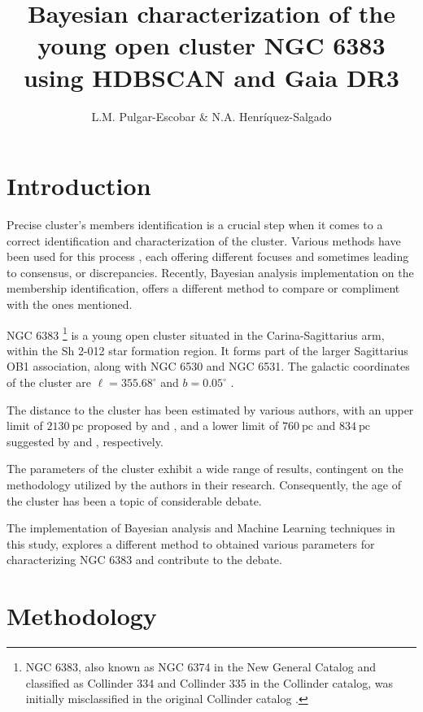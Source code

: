 \documentclass[baaa]{baaa}
\title{Bayesian characterization of the young open cluster NGC 6383 using HDBSCAN and Gaia DR3}
\author{
L.M. Pulgar-Escobar \inst{1} \& N.A. Henríquez-Salgado\inst{1}}
\institute{Departamento de Astronom{\'\i}a, Universidad de Concepci\'on, Chile
}
\begin{document}
\maketitle

\section{Introduction}\label{S_intro}

Precise cluster’s members identification is a crucial step when it comes to a correct identification and characterization of the cluster. Various methods have been used for this process  \citep{ 1968ArA.....5....1L,1978MNRAS.182..607F, 1989MNRAS.236..263P, 2005AA...438.1163K, 2007AA...462..157P}, each offering different focuses and sometimes leading to consensus, or discrepancies. Recently, Bayesian analysis implementation on the membership identification, offers a different method to compare or compliment with the ones mentioned.

NGC 6383 \footnote{NGC 6383, also known as NGC 6374 in the New General Catalog and classified as Collinder 334 and Collinder 335 in the Collinder catalog, was initially misclassified in the original Collinder catalog \citep{1931AnLun...2....1C}.} is a young open cluster situated in the Carina-Sagittarius arm, within the Sh 2-012 star formation region. It forms part of the larger Sagittarius OB1 association, along with NGC 6530 and NGC 6531. The galactic coordinates of the cluster are $\ell = 355.68^{\circ}$ and $b = 0.05^{\circ}$ \citep{2008hsf2.book..497R}. 

The distance to the cluster has been estimated by various authors, with an upper limit of $2130 ~\mathrm{pc}$ proposed by \cite{1930LicOB..14..154T} and \cite{1937LicOB..18...89Z}, and a lower limit of $760~\mathrm{pc}$ and $834~\mathrm{pc}$ suggested by \cite{1949ApJ...110..117S} and \cite{2018AA...610A..30Arib}, respectively.

The parameters of the cluster exhibit a wide range of results, contingent on the methodology utilized by the authors in their research. Consequently, the age of the cluster has been a topic of considerable debate.

The implementation of Bayesian analysis and Machine Learning techniques in this study, explores a different method to obtained various parameters for characterizing NGC 6383 and contribute to the debate.

\section{Methodology}
\end{document}
